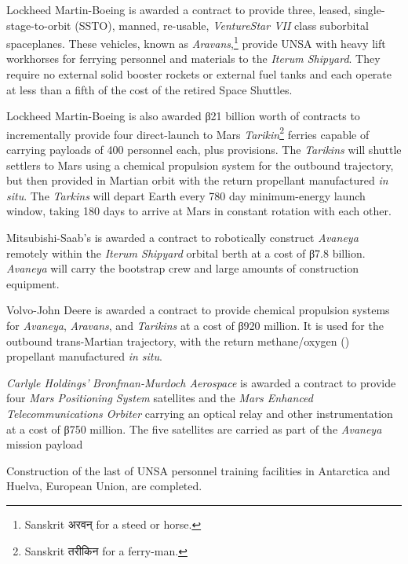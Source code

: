 Lockheed Martin-Boeing is awarded a contract to provide three, leased, single-stage-to-orbit (SSTO), manned, re-usable, {\it VentureStar VII} class suborbital spaceplanes. These vehicles, known as {\it Aravans},\footnote{Sanskrit अरवन् for a steed or horse.} provide UNSA with heavy lift workhorses for ferrying personnel and materials to the {\it Iterum Shipyard}. They require no external solid booster rockets or external fuel tanks and each operate at less than a fifth of the cost of the retired Space Shuttles.

Lockheed Martin-Boeing is also awarded β21 billion worth of contracts to incrementally provide four direct-launch to Mars {\it Tarikin}\footnote{Sanskrit तरीकिन for a ferry-man.} ferries capable of carrying payloads of 400 personnel each, plus provisions. The {\it Tarikins} will shuttle settlers to Mars using a chemical  propulsion system for the outbound trajectory, but then provided in Martian orbit with the return  propellant manufactured {\it in situ}. The {\it Tarkins} will depart Earth every 780 day minimum-energy launch window, taking 180 days to arrive at Mars in constant rotation with each other.

Mitsubishi-Saab's is awarded a contract to robotically construct {\it Avaneya} remotely within the {\it Iterum Shipyard} orbital berth at a cost of β7.8 billion. {\it Avaneya} will carry the bootstrap crew and large amounts of construction equipment.

Volvo-John Deere is awarded a contract to provide chemical propulsion systems for {\it Avaneya}, {\it Aravans}, and {\it Tarikins} at a cost of β920 million. It is used for the outbound trans-Martian trajectory, with the return methane/oxygen () propellant manufactured {\it in situ}.

{\it Carlyle Holdings'} {\it Bronfman-Murdoch Aerospace} is awarded a contract to provide four {\it Mars Positioning System} satellites and the {\it Mars Enhanced Telecommunications Orbiter} carrying an optical relay and other instrumentation at a cost of β750 million. The five satellites are carried as part of the {\it Avaneya} mission payload
\StopTimelineDate

Construction of the last of UNSA personnel training facilities in Antarctica and Huelva, European Union, are completed.
\StopTimelineDate

